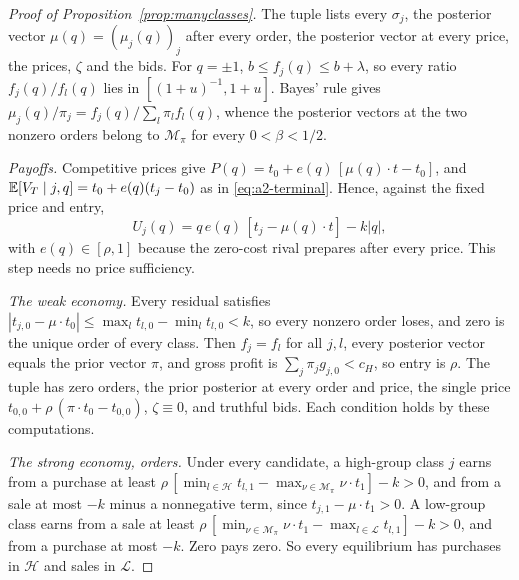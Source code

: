 \begin{proof}[Proof of Proposition~\ref{prop:manyclasses}]
The tuple lists every \(\sigma_j\), the posterior vector \(\mu(q)=(\mu_j(q))_j\) after every order,
the posterior vector at every price, the prices, \(\zeta\) and the bids. For \(q=\pm1\),
\(b\le f_j(q)\le b+\lambda\), so every ratio \(f_j(q)/f_l(q)\) lies in \([(1+u)^{-1},1+u]\).
Bayes' rule gives \(\mu_j(q)/\pi_j=f_j(q)/\sum_l\pi_lf_l(q)\), whence the posterior vectors at the two nonzero
orders belong to \(\mathcal M_\pi\) for every \(0<\beta<1/2\).

\emph{Payoffs.} Competitive prices give \(P(q)=t_0+e(q)\,[\mu(q)\cdot t-t_0]\), and
\(\mathbb{E}[V_T\mid j,q]=t_0+e(q)(t_j-t_0)\) as in \eqref{eq:a2-terminal}. Hence, against the fixed price and entry,
\[
U_j(q)=q\,e(q)\,[t_j-\mu(q)\cdot t]-k|q| ,
\]
with \(e(q)\in[\rho,1]\) because the zero-cost rival prepares after every price. This step needs no price
sufficiency.

\emph{The weak economy.} Every residual satisfies \(|t_{j,0}-\mu\cdot t_0|\le\max_lt_{l,0}-\min_lt_{l,0}<k\), so
every nonzero order loses, and zero is the unique order of every class. Then \(f_j=f_l\) for all \(j,l\), every
posterior vector equals the prior vector \(\pi\), and gross profit is \(\sum_j\pi_jg_{j,0}<c_H\), so entry is \(\rho\).
The tuple has zero orders, the prior posterior at every order and price, the single price
\(t_{0,0}+\rho\,(\pi\cdot t_0-t_{0,0})\), \(\zeta\equiv0\), and truthful bids. Each condition holds by these
computations.

\emph{The strong economy, orders.} Under every candidate, a high-group class \(j\) earns from a purchase at least
\(\rho\,[\min_{l\in\mathcal H}t_{l,1}-\max_{\nu\in\mathcal M_\pi}\nu\cdot t_1]-k>0\), and from a sale at most \(-k\)
minus a nonnegative term, since \(t_{j,1}-\mu\cdot t_1>0\). A low-group class earns from a sale at least
\(\rho\,[\min_{\nu\in\mathcal M_\pi}\nu\cdot t_1-\max_{l\in\mathcal L}t_{l,1}]-k>0\), and from a purchase at most
\(-k\). Zero pays zero. So every equilibrium has purchases in \(\mathcal H\) and sales in \(\mathcal L\).


\end{proof}
